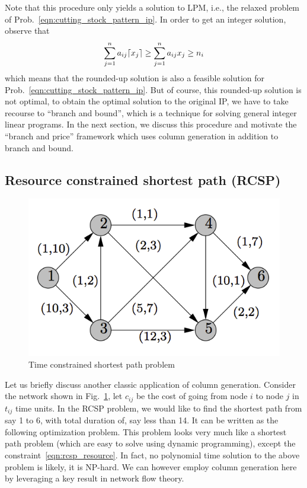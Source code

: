\documentclass[letterpaper, 10pt, twocolumn, reqno]{amsart}
\begin{document}
Note that this procedure only yields a solution to LPM, i.e., the relaxed problem of Prob.~\eqref{eqn:cutting_stock_pattern_ip}. In order to get an integer solution, observe that
$$
\sum_{j=1}^n a_{ij} \lceil x_j\rceil \geq \sum_{j=1}^n a_{ij} x_j \geq n_i
$$
which means that the rounded-up solution is also a feasible solution for Prob.~\eqref{eqn:cutting_stock_pattern_ip}. But of course, this rounded-up solution is not optimal, to obtain the optimal solution to the original IP, we have to take recourse to ``branch and bound'', which is a technique for solving general integer linear programs. In the next section, we discuss this procedure and motivate the ``branch and price'' framework which uses column generation in addition to branch and bound.

\subsection{Resource constrained shortest path (RCSP)}
\label{ssec:rcsp}

\begin{figure}
\centering
\includegraphics[width=0.7 \columnwidth]{rcsp}
\caption{Time constrained shortest path problem}
\label{fig:rcsp}
\end{figure}

Let us briefly discuss another classic application of column generation. Consider the network shown in Fig.~\ref{fig:rcsp}, let $c_{ij}$ be the cost of going from node $i$ to node $j$ in $t_{ij}$ time units. In the RCSP problem, we would like to find the shortest path from say 1 to 6, with total duration of, say less than 14. It can be written as the following optimization problem.
This problem looks very much like a shortest path problem (which are easy to solve using dynamic programming), except the constraint~\eqref{eqn:rcsp_resource}. In fact, no polynomial time solution to the above problem is likely, it is NP-hard. We can however employ column generation here by leveraging a key result in network flow theory.
\end{document}

